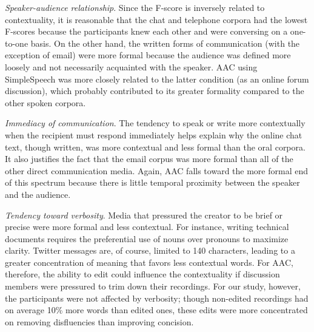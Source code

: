\emph{Speaker-audience relationship}. 
Since the F-score is inversely related to contextuality, it is reasonable that the chat and telephone corpora had the lowest F-scores because the participants knew each other and were conversing on a one-to-one basis. 
On the other hand, the written forms of communication (with the exception of email) were more formal because the audience was defined more loosely and not necessarily acquainted with the speaker.
AAC using SimpleSpeech was more closely related to the latter condition (as an online forum discussion), which probably contributed to its greater formality compared to the other spoken corpora.

\emph{Immediacy of communication}. 
The tendency to speak or write more contextually when the recipient must respond immediately helps explain why the online chat text, though written, was more contextual and less formal than the oral corpora. 
It also justifies the fact that the email corpus was more formal than all of the other direct communication media.
Again, AAC falls toward the more formal end of this spectrum because there is little temporal proximity between the speaker and the audience.

\emph{Tendency toward verbosity}.
Media that pressured the creator to be brief or precise were more formal and less contextual.
For instance, writing technical documents requires the preferential use of nouns over pronouns to maximize clarity.
Twitter messages are, of course, limited to 140 characters, leading to a greater concentration of meaning that favors less contextual words.
For AAC, therefore, the ability to edit could influence the contextuality if discussion members were pressured to trim down their recordings. 
For our study, however, the participants were not affected by verbosity; though non-edited recordings had on average 10\% more words than edited ones, these edits were more concentrated on removing disfluencies than improving concision.
